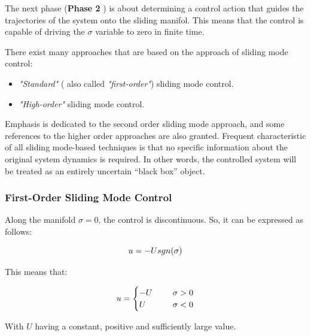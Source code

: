 \documentclass{thesisreport}
\begin{document}
\noindent The next phase (\textbf{Phase 2 }) is about determining a control action that guides the trajectories of the system onto the sliding manifol. This means that the control is capable of driving the $\sigma$ variable to zero in finite time.


\noindent There exist many approaches that are based on the approach of sliding mode control:

\begin{itemize}
	\item \textit{"Standard"} ( also called \textit{"first-order"}) sliding mode control.
	\item \textit{"High-order"} sliding mode control.
\end{itemize}


Emphasis is dedicated to the second order sliding mode approach, and some references to the higher order approaches
are also granted. Frequent characteristic of all sliding mode-based techniques is that no specific information about the
original system dynamics is required. In other words, the controlled system will be treated as an entirely uncertain “black box” object.



\subsubsection{First-Order Sliding Mode Control}


Along the manifold $\sigma=0$, the control is discontinuous. So, it can be expressed as follows:

\begin{equation}
	u = -U \space sgn(\sigma)
\end{equation}


This means that:

\begin{equation}
\begin{aligned}
	u = \begin{cases}
		-U \hspace{0.5cm} &\sigma>0 \\
		U \hspace{0.5cm}  &\sigma<0
	\end{cases}
\end{aligned}
\end{equation}

With $U$ having a constant, positive and sufficiently large value.
\end{document}
